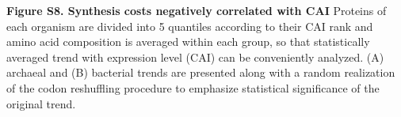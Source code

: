 \documentclass{report}
\begin{document}
{\bf Figure S8. Synthesis costs negatively correlated with CAI} Proteins of each organism are divided into 5 quantiles according to their CAI rank and amino acid composition is averaged within each group, so that statistically averaged trend with expression level (CAI) can be conveniently analyzed. (A) archaeal and (B) bacterial trends are presented along with a random realization of the codon reshuffling procedure to emphasize statistical significance of the original trend.




\begin{figure}[h!]
	\centering
\end{figure}



\end{document}
